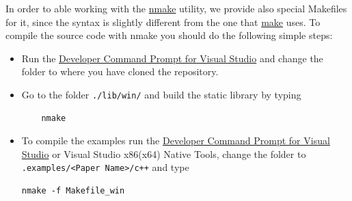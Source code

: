 \documentclass[a4wide,11pt]{article}
\renewcommand{\[}{\begin{equation}}
\renewcommand{\]}{\end{equation}}
\renewcommand{\{}{\begin{eqnarray}}
\renewcommand{\}}{\end{eqnarray}}
\begin{document}
In order to able working with the \href{https://msdn.microsoft.com/en-us/library/dd9y37ha.aspx}{nmake} utility, we provide also special Makefiles for it, since the syntax is slightly different from the one that \href{https://www.gnu.org/software/make/}{make} uses. To compile the source code with nmake you should do the following simple steps:
\begin{itemize}
	\item 
	Run the \href{https://msdn.microsoft.com/en-us/library/ms229859(v=vs.110).aspx}{Developer Command Prompt for Visual Studio} and change the folder to where you have cloned the repository.
	\item 
	Go to the folder \texttt{./lib/win/} and build the static library  by typing
	\begin{verbatim}
	nmake
	\end{verbatim}
	\item
	To compile the examples run the \href{https://msdn.microsoft.com/en-us/library/ms229859(v=vs.110).aspx}{Developer Command Prompt for Visual Studio} or Visual Studio x86(x64) Native Tools, change the folder to \texttt{.examples/<Paper Name>/c++} and type
\begin{verbatim}
nmake -f Makefile_win
\end{verbatim}
\end{itemize}
\end{document}
